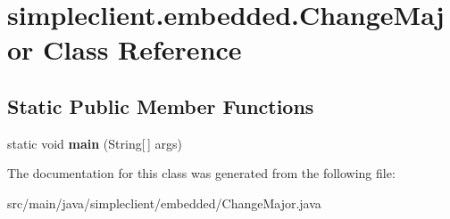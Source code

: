 \hypertarget{classsimpleclient_1_1embedded_1_1ChangeMajor}{}\section{simpleclient.\+embedded.\+Change\+Major Class Reference}
\label{classsimpleclient_1_1embedded_1_1ChangeMajor}
\subsection*{Static Public Member Functions}
\begin{DoxyCompactItemize}
\item 
\mbox{\label{classsimpleclient_1_1embedded_1_1ChangeMajor_af9e5545c77a01d5a3e7e6787fd20df1e}} 
static void {\bfseries main} (String\mbox{[}$\,$\mbox{]} args)
\end{DoxyCompactItemize}


The documentation for this class was generated from the following file\+:\begin{DoxyCompactItemize}
\item 
src/main/java/simpleclient/embedded/Change\+Major.\+java\end{DoxyCompactItemize}
